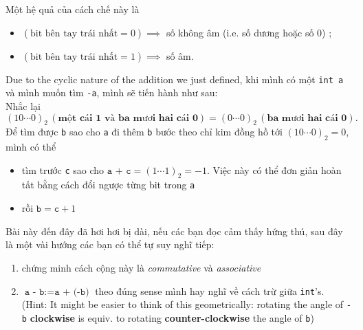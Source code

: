 \documentclass{article}
\begin{document}
Một hệ quả của cách chế này là
\begin{itemize}
	\item $(\textrm{bit bên tay trái nhất}=0) \implies$ số không âm (i.e. số dương hoặc số $0$) ;
	\item $(\textrm{bit bên tay trái nhất}=1) \implies$ số âm.
\end{itemize}

Due to the cyclic nature of the addition we just defined, khi mình có một \texttt{int a} và mình muốn tìm \texttt{-a}, mình sẽ tiến hành như sau:\\
Nhắc lại $$(10\cdots0)_{2} \,(\textbf{một cái 1 và ba mươi hai cái 0}) = (0\cdots0)_{2} \,(\textbf{ba mươi hai cái 0}).$$
Để tìm được \texttt{b} sao cho \texttt{a} đi thêm \texttt{b} bước theo chỉ kim đồng hồ tới $(10\cdots0)_{2} = 0$, mình có thể
\begin{itemize}
	\item tìm trước \texttt{c} sao cho $\texttt{a + c} = (1\cdots1)_{2} = -1$. Việc này có thể đơn giản hoàn tất bằng cách đổi ngược từng bit trong \texttt{a}
	\item rồi $\texttt{b} = \texttt{c} + 1$
\end{itemize}

Bài này đến đây đã hơi hơi bị dài, nếu các bạn đọc cảm thấy hứng thú, sau đây là một vài hướng các bạn có thể tự suy nghĩ tiếp:
\begin{enumerate}
	\item chứng minh cách cộng này là \emph{commutative} và \emph{associative}
	\item $\texttt{a - b} := \texttt{a + (-b)}$ theo đúng sense mình hay nghĩ về cách trừ giữa \texttt{int}'s. (Hint: It might be easier to think of this geometrically: rotating the angle of \texttt{-b} \textbf{clockwise} is equiv. to rotating \textbf{counter-clockwise} the angle of \texttt{b})
\end{enumerate}
\end{document}
